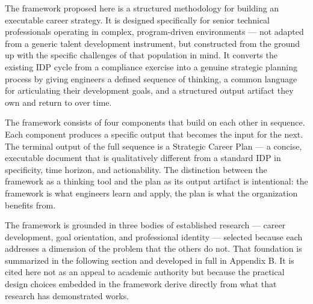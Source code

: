 \documentclass{article}
\begin{document}
The framework proposed here is a structured methodology for building an executable career strategy. It is designed specifically for 
senior technical professionals operating in complex, program-driven environments — not adapted from a generic talent development 
instrument, but constructed from the ground up with the specific challenges of that population in mind. It converts the existing 
IDP cycle from a compliance exercise into a genuine strategic planning process by giving engineers a defined sequence of thinking, 
a common language for articulating their development goals, and a structured output artifact they own and return to over time.

The framework consists of four components that build on each other in sequence. Each component produces a specific output that becomes 
the input for the next. The terminal output of the full sequence is a Strategic Career Plan — a concise, executable document that is 
qualitatively different from a standard IDP in specificity, time horizon, and actionability. The distinction between the framework as 
a thinking tool and the plan as its output artifact is intentional: the framework is what engineers learn and apply, the plan is what 
the organization benefits from.

The framework is grounded in three bodies of established research — career development, goal orientation, and professional identity 
— selected because each addresses a dimension of the problem that the others do not. That foundation is summarized in the following section 
and developed in full in Appendix B. It is cited here not as an appeal to academic authority but because the practical design choices 
embedded in the framework derive directly from what that research has demonstrated works.
\end{document}
